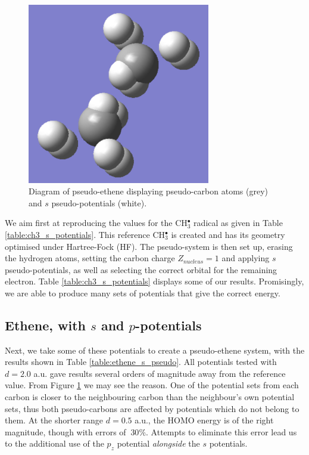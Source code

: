 \documentclass[journal=jctcce,manuscript=article]{achemso}
\begin{document}
\begin{figure}
\includegraphics[width=8cm]{long_r_ethene_diagram.png}
\caption{Diagram of pseudo-ethene displaying pseudo-carbon atoms (grey) and \(s\) pseudo-potentials (white).}
\label{fig:long_r_ethene}
\end{figure}

We aim first at reproducing the values for the CH\(^{\bullet}_{3}\) radical as given in Table \ref{table:ch3_s_potentials}. 
This reference CH\(^{\bullet}_{3}\) is created and has its geometry optimised under Hartree-Fock (HF). The pseudo-system is then set up, erasing the hydrogen atoms, setting the carbon charge \(Z_{nucleus} = 1\) and applying \(s\) pseudo-potentials, as well as selecting the correct orbital for the remaining electron. Table \ref{table:ch3_s_potentials} displays some of our results. Promisingly, we are able to produce many sets of potentials that give the correct energy.%

\subsection{Ethene, with \(s\) and \(p\)-potentials}

Next, we take some of these potentials to create a pseudo-ethene system, with the results shown in Table \ref{table:ethene_s_pseudo}. All potentials tested with \(d = 2.0\) a.u. gave results several orders of magnitude away from the reference value. From Figure \ref{fig:long_r_ethene} we may see the reason. One of the potential sets from each carbon is closer to the neighbouring carbon than the neighbour's own potential sets, thus both pseudo-carbons are affected by potentials which do not belong to them. At the shorter range \(d = 0.5\) a.u., the HOMO energy is of the right magnitude, though with errors of \(~ 30\%\). Attempts to eliminate this error lead us to the additional use of the \(p_{z}\) potential \textit{alongside} the \(s\) potentials.
\end{document}
